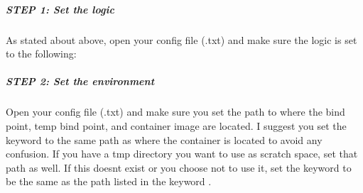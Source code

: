 \documentclass[letterpaper,10pt,english]{sphinxmanual}
\begin{document}
\subparagraph{STEP 1: Set the logic}
\label{\detokenize{fullPipelineBinaryTutorial:step-1-set-the-logic}}
As stated about above, open your config file (.txt) and make sure the logic is set to the following:

\begin{sphinxVerbatim}[commandchars=\\\{\}]
\end{sphinxVerbatim}


\subparagraph{STEP 2: Set the environment}
\label{\detokenize{fullPipelineBinaryTutorial:step-2-set-the-environment}}
Open your config file (.txt) and make sure you set the path to where the bind point, temp bind point, and  container image are located.  I suggest you set the  keyword to the same path as where the container is located to avoid any confusion.  If you have a tmp directory you want to use as scratch space, set that path as well.  If this doesn\textquotesingle{}t exist or you choose not to use it, set the keyword  to be the same as the path listed in the keyword .

\begin{sphinxVerbatim}[commandchars=\\\{\}]
\end{sphinxVerbatim}
\end{document}
